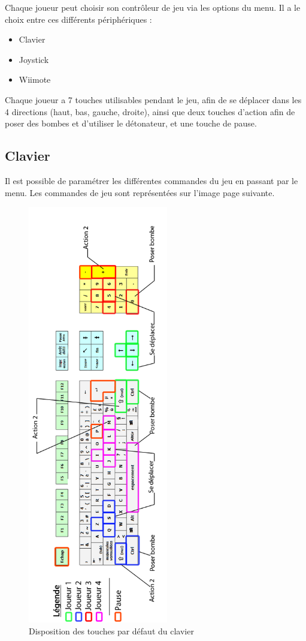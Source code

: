 Chaque joueur peut choisir son contrôleur de jeu via les options du menu. Il a le choix entre ces différents périphériques :

\begin{itemize}
    \item Clavier
    \item Joystick
    \item Wiimote
\end{itemize}

\vspace{0.5cm}

Chaque joueur a 7 touches utilisables pendant le jeu, afin de se déplacer dans les 4 directions (haut, bas, gauche, droite), ainsi que deux touches d'action afin de poser des bombes et d'utiliser le détonateur, et une touche de pause.
	
\subsection{Clavier}

Il est possible de paramétrer les différentes commandes du jeu en passant par le menu. Les commandes de jeu sont représentées sur l'image page suivante.

\begin{figure}
    \begin{center}
	    \includegraphics[height=520pt]{images/clavier}
    \end{center}
    \caption{Disposition des touches par défaut du clavier}
\end{figure}

